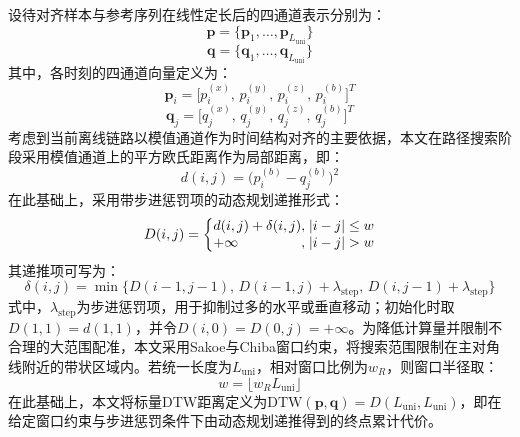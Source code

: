 \documentclass{xdupgthesis}
\begin{document}
\enlargethispage{\baselineskip}
{\setlength{\abovedisplayskip}{8pt}
\setlength{\belowdisplayskip}{8pt}
\setlength{\abovedisplayshortskip}{8pt}
\setlength{\belowdisplayshortskip}{8pt}
设待对齐样本与参考序列在线性定长后的四通道表示分别为：
\begin{equation}
    \mathbf{p}=\{\mathbf{p}_1,\ldots,\mathbf{p}_{L_{\mathrm{uni}}}\}
\end{equation}
\begin{equation}
    \mathbf{q}=\{\mathbf{q}_1,\ldots,\mathbf{q}_{L_{\mathrm{uni}}}\}
\end{equation}
其中，各时刻的四通道向量定义为：
\begin{equation}
    \mathbf{p}_i=\big[p_i^{(x)},\,p_i^{(y)},\,p_i^{(z)},\,p_i^{(b)}\big]^T
\end{equation}
\vspace{2pt}
\begin{equation}
    \mathbf{q}_j=\big[q_j^{(x)},\,q_j^{(y)},\,q_j^{(z)},\,q_j^{(b)}\big]^T
\end{equation}
考虑到当前离线链路以模值通道作为时间结构对齐的主要依据，本文在路径搜索阶段采用模值通道上的平方欧氏距离作为局部距离，即：
\begin{equation}
    d(i,j)=\big(p_i^{(b)}-q_j^{(b)}\big)^2
\end{equation}
}
在此基础上，采用带步进惩罚项的动态规划递推形式：
\begin{equation}
    D(i,j)=
    \left\{
    \begin{array}{@{}l@{,\;}l@{}}
        d(i,j)+\delta(i,j) & |i-j|\le w\\
        +\infty & |i-j|>w
    \end{array}
    \right.
\end{equation}
其递推项可写为：
\begin{equation}
    \delta(i,j)=\min\big\{D(i-1,j-1),\,D(i-1,j)+\lambda_{\mathrm{step}},\,D(i,j-1)+\lambda_{\mathrm{step}}\big\}
\end{equation}
式中，$\lambda_{\mathrm{step}}$为步进惩罚项，用于抑制过多的水平或垂直移动；初始化时取$D(1,1)=d(1,1)$，并令$D(i,0)=D(0,j)=+\infty$。为降低计算量并限制不合理的大范围配准，本文采用Sakoe与Chiba窗口约束，将搜索范围限制在主对角线附近的带状区域内。若统一长度为$L_{\mathrm{uni}}$，相对窗口比例为$w_R$，则窗口半径取：
\begin{equation}
    w=\lfloor w_R L_{\mathrm{uni}} \rfloor
\end{equation}
在此基础上，本文将标量DTW距离定义为$\mathrm{DTW}(\mathbf{p},\mathbf{q})=D(L_{\mathrm{uni}},L_{\mathrm{uni}})$，即在给定窗口约束与步进惩罚条件下由动态规划递推得到的终点累计代价。
\end{document}
